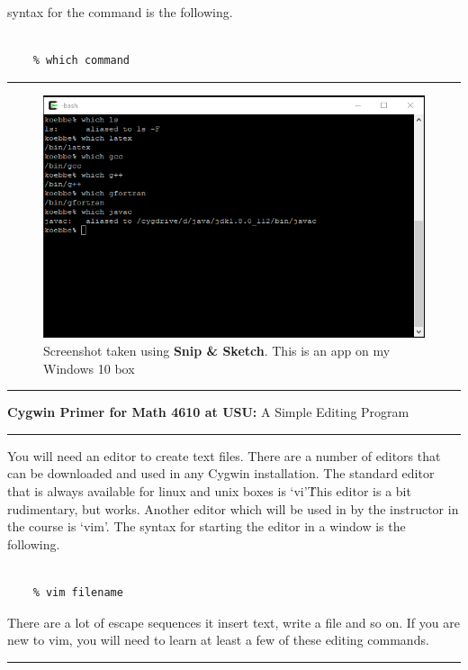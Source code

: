 \documentclass[10pt,fleqn]{article}
\begin{document}
syntax for the command is the following.
\begin{verbatim}

    % which command

\end{verbatim}
\vskip0.1in\hrule\vskip0.1in
\vfill
\begin{figure}[h]
\centering
\includegraphics{../images/cygwin_04.png}
\caption{{Screenshot} taken using {\bf Snip \& Sketch}. This is an app on
         my Windows 10 box}
\end{figure}
\eject
\vskip0.1in\hrule\vskip0.1in
\noindent
{{\bf Cygwin Primer for Math 4610 at USU:} A Simple Editing Program} 
\vskip0.1in\hrule\vskip0.1in
\noindent
You will need an editor to create text files. There are a number of editors that
can be downloaded and used in any Cygwin installation. The standard editor that
is always available for linux and unix boxes is \lq vi\rq\. This editor is a bit
rudimentary, but works. Another editor which will be used in by the instructor
in the course is \lq vim\rq. The syntax for starting the editor in a window is
the following.
\begin{verbatim}

    % vim filename

\end{verbatim}
There are a lot of escape sequences it insert text, write a file and so on. If
you are new to vim, you will need to learn at least a few of these editing
commands.
\vskip0.1in\hrule\vskip0.1in
\vfill
\end{document}
